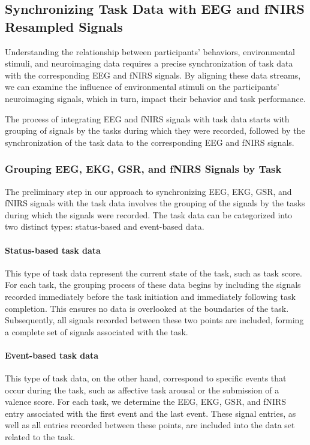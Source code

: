 \subsection{Synchronizing Task Data with EEG and fNIRS Resampled Signals}

Understanding the relationship between participants' behaviors, environmental stimuli, and neuroimaging data requires a precise synchronization of task data with the corresponding EEG and fNIRS signals. By aligning these data streams, we can examine the influence of environmental stimuli on the participants' neuroimaging signals, which in turn, impact their behavior and task performance.

The process of integrating EEG and fNIRS signals with task data starts with grouping of signals by the tasks during which they were recorded, followed by the synchronization of the task data to the corresponding EEG and fNIRS signals.

\subsubsection{Grouping EEG, EKG, GSR, and fNIRS Signals by Task}

The preliminary step in our approach to synchronizing EEG, EKG, GSR, and fNIRS signals with the task data involves the grouping of the signals by the tasks during which the signals were recorded. The task data can be categorized into two distinct types: status-based and event-based data.

\paragraph{Status-based task data} This type of task data represent the current state of the task, such as task score. For each task, the grouping process of these data begins by including the signals recorded immediately before the task initiation and immediately following task completion. This ensures no data is overlooked at the boundaries of the task. Subsequently, all signals recorded between these two points are included, forming a complete set of signals associated with the task.

\paragraph{Event-based task data} This type of task data, on the other hand, correspond to specific events that occur during the task, such as affective task arousal or the submission of a valence score. For each task, we determine the EEG, EKG, GSR, and fNIRS entry associated with the first event and the last event. These signal entries, as well as all entries recorded between these points, are included into the data set related to the task.


